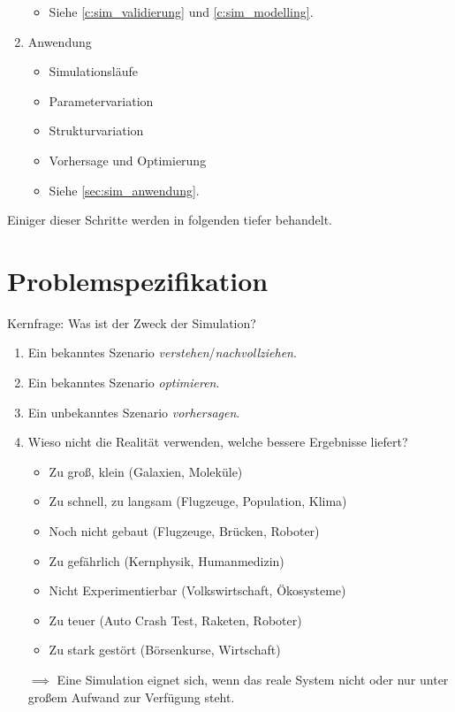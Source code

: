 \documentclass[a4paper, 11pt, accentcolor = tud3b]{tudreport}
\begin{document}
\begin{enumerate}
\begin{itemize}
	        		\item Siehe \ref{c:sim_validierung} und \ref{c:sim_modelling}.
	        	\end{itemize}
        	\item Anwendung
	        	\begin{itemize}
	        		\item Simulationsläufe
	        		\item Parametervariation
	        		\item Strukturvariation
	        		\item Vorhersage und Optimierung
	        		\item Siehe \ref{sec:sim_anwendung}.
	        	\end{itemize}
        \end{enumerate}
        Einiger dieser Schritte werden in folgenden tiefer behandelt.

        \section{Problemspezifikation} %
	        \label{sec:sim_problemspez}
        
            Kernfrage: Was ist der Zweck der Simulation?
            
            \begin{enumerate}
            	\item Ein bekanntes Szenario \textit{verstehen}/\textit{nachvollziehen}.
            	\item Ein bekanntes Szenario \textit{optimieren}.
            	\item Ein unbekanntes Szenario \textit{vorhersagen}.
            	\item Wieso nicht die Realität verwenden, welche bessere Ergebnisse liefert?
	            	\begin{itemize}
	            		\item Zu groß, klein (Galaxien, Moleküle)
	            		\item Zu schnell, zu langsam (Flugzeuge, Population, Klima)
	            		\item Noch nicht gebaut (Flugzeuge, Brücken, Roboter)
	            		\item Zu gefährlich (Kernphysik, Humanmedizin)
	            		\item Nicht Experimentierbar (Volkswirtschaft, Ökosysteme)
	            		\item Zu teuer (Auto Crash Test, Raketen, Roboter)
	            		\item Zu stark gestört (Börsenkurse, Wirtschaft)
	            	\end{itemize}
	            \item[\( \implies \)] Eine Simulation eignet sich, wenn das reale System nicht oder nur unter großem Aufwand zur Verfügung steht.
            \end{enumerate}
\end{document}
